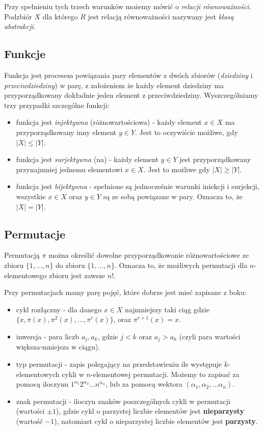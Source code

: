 \documentclass[11pt]{article}
\theoremstyle{definition}
\numberwithin{zadanie}{subsection}
\begin{document}
Przy spełnieniu tych trzech warunków możemy mówić o \textit{relacji równoważności}. Podzbiór $X$ dla którego $R$ jest relacją równoważności nazywany jest \textit{klasą abstrakcji}.

\subsection{Funkcje}

Funkcja jest procesem powiązania pary elementów z dwóch zbiorów (\textit{dziedziny} i \textit{przeciwdziedziny}) w parę, z założeniem że każdy element dziedziny ma przyporządkowany dokładnie jeden element z przeciwdziedziny. Wyszczególniamy trzy przypadki szczególne funkcji:

\begin{itemize}
    \item funkcja jest \textit{injektywna} (różnowartościowa) - każdy element $x\in X$ ma przyporządkowany inny element $y\in Y$. Jest to oczywiście możliwe, gdy $|X|\leq|Y|$.
    \item funkcja jest \textit{surjektywna} (na) - każdy element $y\in Y$ jest przyporządkowany przynajmniej jednemu elementowi $x\in X$. Jest to możliwe gdy $|X|\geq|Y|$.
    \item funkcja jest \textit{bijektywna} - spełnione są jednocześnie warunki iniekcji i surjekcji, wszystkie $x\in X$ oraz $y\in Y$ są ze sobą powiązane w pary. Oznacza to, że $|X|=|Y|$.
\end{itemize}

\subsection{Permutacje}

Permutacją $\pi$ można określić dowolne przyporządkowanie różnowartościowe ze zbioru $\{1,...,n\}$ do zbioru $\{1,...,n\}$. Oznacza to, że możliwych permutacji dla $n$-elementowego zbioru jest zawsze $n!$.

Przy permutacjach mamy parę pojęć, które dobrze jest mieć zapisane z boku:

\begin{itemize}
    \item cykl rozłączny - dla danego $x\in X$ najmniejszy taki ciąg gdzie $\{x, \pi(x), \pi^2(x),...,\pi^{r}(x)\}$, oraz $\pi^{r+1}(x) = x$.
    \item inwersja - para liczb $a_j, a_k$, gdzie $j<k$ oraz $a_j > a_k$ (czyli para wartości większa-mniejsza w ciągu).
    \item typ permutacji - zapis polegający na przedstawieniu ile występuje $k$-elementowych cykli w $n$-elementowej permutacji. Możemy to zapisać za pomocą iloczynu $1^{\alpha_1}2^{\alpha_2}...n^{\alpha_n}$, lub za pomocą wektora $(\alpha_1,\alpha_2,...\alpha_n)$.
    \item znak permutacji - iloczyn znaków poszczególnych cykli w permutacji (wartości $\pm 1$), gdzie cykl o parzystej liczbie elementów jest \textbf{nieparzysty} (wartość $-1$), natomiast cykl o nieparzystej liczbie elementów jest \textbf{parzysty}.
\end{itemize}
\end{document}

